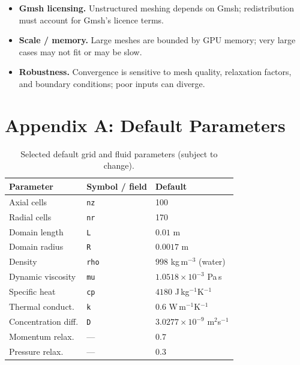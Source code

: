 \documentclass[11pt]{article}
\begin{document}
\begin{itemize}[nosep]
        for a local Ampere target (\texttt{sm\_86}). Release builds must broaden the
        CUDA architecture list or include a PTX fallback before distributing to other
        NVIDIA GPUs.
  \item \textbf{Gmsh licensing.} Unstructured meshing depends on Gmsh; redistribution
        must account for Gmsh's licence terms.
  \item \textbf{Scale / memory.} Large meshes are bounded by GPU memory; very large
        cases may not fit or may be slow.
  \item \textbf{Robustness.} Convergence is sensitive to mesh quality, relaxation
        factors, and boundary conditions; poor inputs can diverge.
\end{itemize}

\section*{Appendix A: Default Parameters}
\begin{table}[h]
\centering
\caption{Selected default grid and fluid parameters (subject to change).}
\begin{tabular}{@{}lll@{}}
\toprule
\textbf{Parameter} & \textbf{Symbol / field} & \textbf{Default} \\
\midrule
Axial cells        & \texttt{nz}  & 100 \\
Radial cells       & \texttt{nr}  & 170 \\
Domain length      & \texttt{L}   & \(0.01\) m \\
Domain radius      & \texttt{R}   & \(0.0017\) m \\
Density            & \texttt{rho} & \(998\) kg\,m\(^{-3}\) (water) \\
Dynamic viscosity  & \texttt{mu}  & \(1.0518\times10^{-3}\) Pa\,s \\
Specific heat      & \texttt{cp}  & \(4180\) J\,kg\(^{-1}\)K\(^{-1}\) \\
Thermal conduct.   & \texttt{k}   & \(0.6\) W\,m\(^{-1}\)K\(^{-1}\) \\
Concentration diff.& \texttt{D}   & \(3.0277\times10^{-9}\) m\(^2\)s\(^{-1}\) \\
Momentum relax.    & ---          & \(0.7\) \\
Pressure relax.    & ---          & \(0.3\) \\
\bottomrule
\end{tabular}
\end{table}
\end{document}
